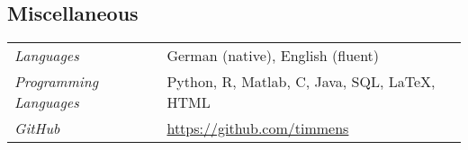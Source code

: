 \documentclass{article}
\begin{document}
\subsection*{Miscellaneous}

\begin{table}[h!]
\renewcommand{\arraystretch}{1.4}
    \begin{tabular}{p{110pt} p{350pt}}
         \textit{Languages} &  German (native), English (fluent)\\
         \textit{Programming Languages} & Python, \textsf{R}, Matlab, C, Java, SQL, \LaTeX, HTML\\
         \textit{GitHub} & \url{https://github.com/timmens}\\
    \end{tabular}
  \end{table}


\end{document}
